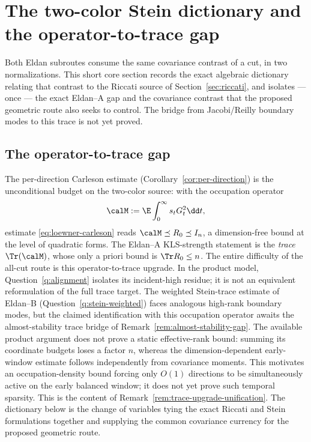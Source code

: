 \documentclass[../../main.tex]{subfiles}
\begin{document}
\section{The two-color Stein dictionary and the operator-to-trace gap}
\label{sec:stein-dictionary}

Both Eldan subroutes consume the same covariance contrast of a cut, in two
normalizations. This short core section records the exact algebraic dictionary relating that
contrast to the Riccati source of Section~\ref{sec:riccati}, and isolates --- once --- the
exact Eldan--A gap and the covariance contrast that the proposed geometric route also seeks to
control. The bridge from Jacobi/Reilly boundary modes to this trace is not yet proved.

\subsection{The operator-to-trace gap}
\label{subsec:one-gap}

The per-direction Carleson estimate (Corollary~\ref{cor:per-direction}) is the unconditional
budget on the two-color source: with the occupation operator
\[
  \calM:=\E\int_0^\infty s_tG_t^2\dd t,
\]
estimate \eqref{eq:loewner-carleson} reads $\calM\preceq R_0\preceq I_n$, a dimension-free
bound at the level of quadratic forms. The Eldan--A KLS-strength statement is the \emph{trace}
$\Tr(\calM)$, whose only a priori bound is $\Tr R_0\le n$. The entire difficulty of the
all-cut route is this operator-to-trace upgrade. In the product model,
Question~\ref{q:alignment} isolates its incident-high residue; it is not an equivalent
reformulation of the full trace target. The weighted Stein-trace estimate of Eldan--B
(Question~\ref{q:stein-weighted}) faces analogous high-rank boundary modes, but the claimed
identification with this occupation operator awaits the almost-stability trace bridge of
Remark~\ref{rem:almost-stability-gap}. The available product argument does not prove a static
effective-rank bound: summing its coordinate budgets loses a factor $n$, whereas the
dimension-dependent early-window estimate follows independently from covariance moments.
This motivates an occupation-density bound forcing only $O(1)$ directions to be simultaneously
active on the early balanced window; it does not yet prove such temporal sparsity. This is the content of
Remark~\ref{rem:trace-upgrade-unification}. The dictionary below is the change of variables
tying the exact Riccati and Stein formulations together and supplying the common covariance currency
for the proposed geometric route.
\end{document}
